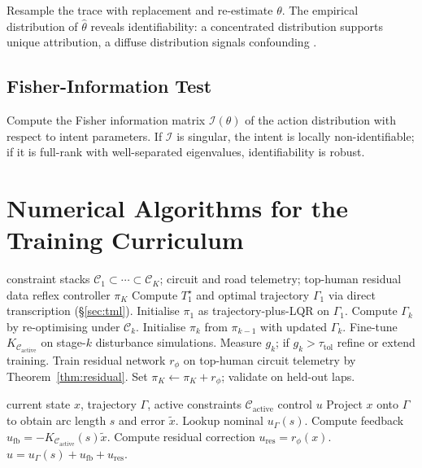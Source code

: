\documentclass[11pt,twocolumn]{article}
\theoremstyle{definition}
\theoremstyle{remark}
\providecommand{\cC}{\mathcal{C}}
\begin{document}
Resample the trace with replacement and re-estimate $\theta$. The empirical distribution of $\hat\theta$ reveals identifiability: a concentrated distribution supports unique attribution, a diffuse distribution signals confounding \cite{efron1993bootstrap,tibshirani2007bootstrap}.

\subsection{Fisher-Information Test}

Compute the Fisher information matrix $\mathcal{I}(\theta)$ of the action distribution with respect to intent parameters. If $\mathcal{I}$ is singular, the intent is locally non-identifiable; if it is full-rank with well-separated eigenvalues, identifiability is robust.

\section{Numerical Algorithms for the Training Curriculum}
\label{app:algorithms}

\begin{algorithm}[H]
\caption{Curriculum-trained reflex controller}
\label{alg:curriculum}
\begin{algorithmic}[1]
\Require constraint stacks $\cC_1 \subset \cdots \subset \cC_K$; circuit and road telemetry; top-human residual data
\Ensure reflex controller $\pi_K$
\State Compute $T^{\star}_1$ and optimal trajectory $\Gamma_1$ via direct transcription (\S\ref{sec:tml}).
\State Initialise $\pi_1$ as trajectory-plus-LQR on $\Gamma_1$.
  \State Compute $\Gamma_k$ by re-optimising under $\cC_k$.
  \State Initialise $\pi_k$ from $\pi_{k-1}$ with updated $\Gamma_k$.
  \State Fine-tune $K_{\cC_{\mathrm{active}}}$ on stage-$k$ disturbance simulations.
  \State Measure $g_k$; if $g_k > \tau_{\mathrm{tol}}$ refine or extend training.
\EndFor
\State Train residual network $r_\phi$ on top-human circuit telemetry by Theorem~\ref{thm:residual}.
\State Set $\pi_K \leftarrow \pi_K + r_\phi$; validate on held-out laps.
\end{algorithmic}
\end{algorithm}

\begin{algorithm}[H]
\caption{Runtime reflex step}
\label{alg:runtime}
\begin{algorithmic}[1]
\Require current state $x$, trajectory $\Gamma$, active constraints $\cC_{\mathrm{active}}$
\Ensure control $u$
\State Project $x$ onto $\Gamma$ to obtain arc length $s$ and error $\tilde x$.
\State Lookup nominal $u_{\Gamma}(s)$.
\State Compute feedback $u_{\mathrm{fb}} = -K_{\cC_{\mathrm{active}}}(s)\tilde x$.
\State Compute residual correction $u_{\mathrm{res}} = r_\phi(x)$.
\State \Return $u = u_{\Gamma}(s) + u_{\mathrm{fb}} + u_{\mathrm{res}}$.
\end{algorithmic}
\end{algorithm}
\end{document}
